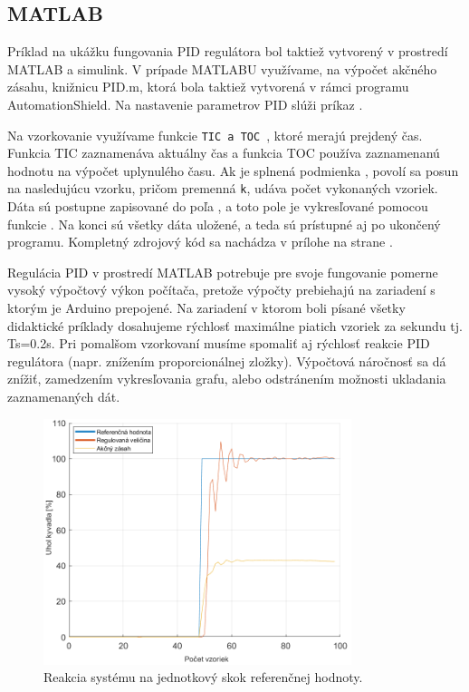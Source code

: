 
\subsection{MATLAB}
\label{MATLABPID}

Príklad na ukážku fungovania PID regulátora bol taktiež vytvorený v prostredí MATLAB a simulink. V prípade MATLABU využívame, na výpočet akčného zásahu, knižnicu PID.m, ktorá bola taktiež vytvorená v rámci programu AutomationShield. Na nastavenie parametrov PID slúži príkaz . 

Na vzorkovanie využívame funkcie \verb|TIC a TOC |, ktoré merajú prejdený čas. Funkcia TIC zaznamenáva aktuálny čas a funkcia TOC používa zaznamenanú hodnotu na výpočet uplynulého času. Ak je splnená podmienka , povolí sa posun na nasledujúcu vzorku, pričom premenná \verb*|k|, udáva počet vykonaných vzoriek. Dáta sú postupne zapisované do poľa , a toto pole je vykresľované pomocou funkcie . Na konci sú všetky dáta uložené, a teda sú prístupné aj po ukončený programu. Kompletný zdrojový kód sa nachádza v prílohe na strane \pageref{AeroShieldPID.m}.

Regulácia PID v prostredí MATLAB potrebuje pre svoje fungovanie pomerne vysoký výpočtový výkon počítača, pretože výpočty prebiehajú na zariadení s ktorým je Arduino prepojené. Na zariadení\cite{Notebook} v ktorom boli písané všetky didaktické príklady dosahujeme rýchlosť maximálne piatich vzoriek za sekundu tj. Ts=0.2s. Pri pomalšom vzorkovaní musíme spomaliť aj rýchlosť reakcie PID regulátora (napr. znížením proporcionálnej zložky). Výpočtová náročnosť sa dá znížiť, zamedzením vykresľovania grafu, alebo odstránením možnosti ukladania zaznamenaných dát. 

\begin{figure}[!tbh]
	\centering
	\includegraphics[width=90mm]{obr/jednotkovyskoskMAt.png}
	\caption{Reakcia systému na jednotkový skok referenčnej hodnoty.}\label{OBRAZOK 2.6.1}
\end{figure}

